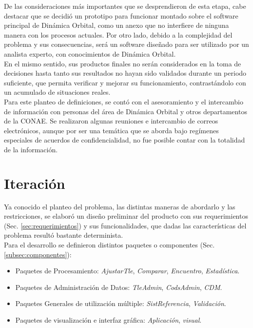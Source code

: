 De las consideraciones m\'as importantes que se desprendieron de esta etapa, cabe destacar que se decidi\'o un prototipo para funcionar montado sobre el software principal de Din\'amica Orbital, como un anexo que no interfiere de ninguna manera con los procesos actuales.
Por otro lado, debido a la complejidad del problema y sus consecuencias, ser\'a un software diseñado para ser utilizado por un analista experto, con conocimientos de Din\'amica Orbital.\\

En el mismo sentido, sus productos finales no ser\'an considerados en la toma de decisiones hasta tanto sus resultados no hayan sido validados durante un periodo suficiente, que permita verificar y mejorar su funcionamiento, contrast\'andolo con un acumulado de situaciones reales.\\

Para este planteo de definiciones, se cont\'o con el asesoramiento y el intercambio de informaci\'on con personas del \'area de Din\'amica Orbital y otros departamentos de la CONAE. Se realizaron algunas reuniones e intercambio de correos electr\'onicos, aunque por ser una tem\'atica que se aborda bajo reg\'imenes especiales de acuerdos de confidencialidad, no fue posible contar con la totalidad de la informaci\'on.

\section{Iteraci\'on}
Ya conocido el planteo del problema, las distintas maneras de abordarlo y las restricciones, se elabor\'o un diseño preliminar del producto con sus requerimientos (Sec. \ref{sec:requerimientos}) y sus funcionalidades, que dadas las caracter\'isticas del problema result\'o bastante determinista.\\

Para el desarrollo se definieron distintos paquetes o componentes (Sec. \ref{subsec:componentes}):\\

\begin{itemize}
\itemsep0em
 \item Paquetes de Procesamiento: {\it{AjustarTle}}, {\it{Comparar}}, {\it{Encuentro}}, {\it{Estad\'istica}}.
 \item Paquetes de Administraci\'on de Datos: {\it{TleAdmin}}, {\it{CodsAdmin}}, {\it{CDM}}.
 \item Paquetes Generales de utilizaci\'on m\'ultiple: {\it{SistReferencia}}, {\it{Validaci\'on}}.
 \item Paquetes de visualizaci\'on e interfaz gr\'afica: {\it{Aplicaci\'on}}, {\it{visual}}.
\end{itemize}

